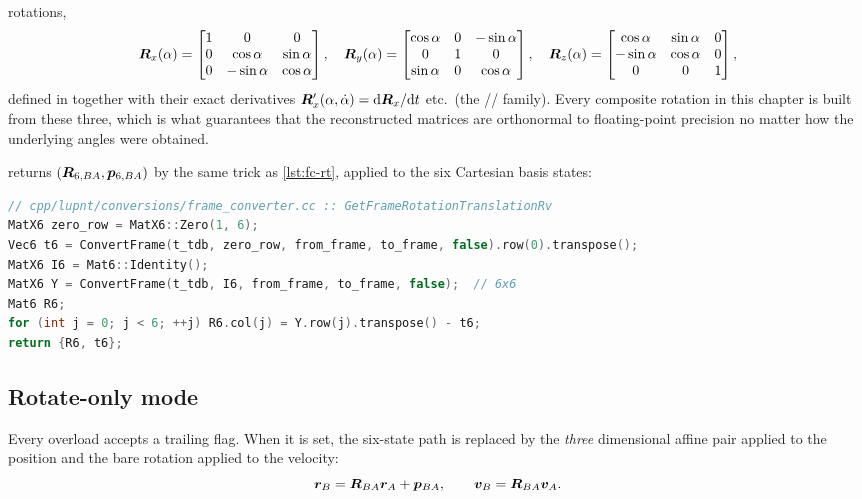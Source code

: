 rotations,
%
\begin{equation}
  \label{eq:fc-elementary}
  \bm{R}_x(\alpha) =
  \begin{bmatrix} 1&0&0\\ 0&\cos\alpha&\sin\alpha\\ 0&-\sin\alpha&\cos\alpha\end{bmatrix},
  \quad
  \bm{R}_y(\alpha) =
  \begin{bmatrix} \cos\alpha&0&-\sin\alpha\\ 0&1&0\\ \sin\alpha&0&\cos\alpha\end{bmatrix},
  \quad
  \bm{R}_z(\alpha) =
  \begin{bmatrix} \cos\alpha&\sin\alpha&0\\ -\sin\alpha&\cos\alpha&0\\ 0&0&1\end{bmatrix},
\end{equation}
%
defined in  together with their exact
derivatives $\bm{R}_x'(\alpha,\dot\alpha) = \mathrm{d}\bm{R}_x/\mathrm{d} t$ etc.\ (the
// family). Every composite rotation
in this chapter is built from these three, which is what guarantees that the
reconstructed matrices are orthonormal to floating-point precision no matter
how the underlying angles were obtained.

 returns
$(\bm{R}_{6,BA}, \bm{p}_{6,BA})$ by the same trick as \cref{lst:fc-rt},
applied to the six Cartesian basis states:

\begin{lstlisting}[language=cpp, caption={Six-state affine transform
  (\texttt{cpp/lupnt/conversions/frame\_converter.cc}).},
  label={lst:fc-rt6}]
// cpp/lupnt/conversions/frame_converter.cc :: GetFrameRotationTranslationRv
MatX6 zero_row = MatX6::Zero(1, 6);
Vec6 t6 = ConvertFrame(t_tdb, zero_row, from_frame, to_frame, false).row(0).transpose();
MatX6 I6 = Mat6::Identity();
MatX6 Y = ConvertFrame(t_tdb, I6, from_frame, to_frame, false);  // 6x6
Mat6 R6;
for (int j = 0; j < 6; ++j) R6.col(j) = Y.row(j).transpose() - t6;
return {R6, t6};
\end{lstlisting}

\subsection{Rotate-only mode}

Every  overload accepts a trailing 
flag. When it is set, the six-state path is replaced by the \emph{three}
dimensional affine pair applied to the position and the bare rotation
applied to the velocity:
%
\begin{equation}
  \label{eq:fc-rotate-only}
  \bm{r}_B = \bm{R}_{BA}\bm{r}_A + \bm{p}_{BA},
  \qquad
  \bm{v}_B = \bm{R}_{BA}\bm{v}_A .
\end{equation}


